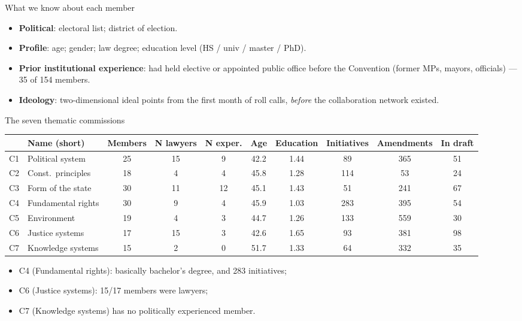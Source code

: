 \documentclass[aspectratio=169,11pt]{beamer}
\newcommand{\emphr}[1]{{\color{ndreddark}\textbf{#1}}}
\begin{document}
\begin{frame}{What we know about each member}
\begin{itemize}
  \item \emphr{Political}: electoral list; district of election.
  \vspace{0.2cm}
  \item \emphr{Profile}: age; gender; law degree; education level (HS / univ / master / PhD).
  \vspace{0.2cm}
  \item \emphr{Prior institutional experience}: had held elective or appointed public office before the Convention (former MPs, mayors, officials) — 35 of 154 members.
  \vspace{0.2cm}
  \item \emphr{Ideology}: two-dimensional ideal points from the first month of roll calls, \emph{before} the collaboration network existed.
\end{itemize}
\end{frame}

\begin{frame}{The seven thematic commissions}
\begin{center}\scriptsize\setlength{\tabcolsep}{3.5pt}
\begin{tabular}{clcccccccc}
\toprule
 & Name (short) & Members & N lawyers & N exper. & Age & Education & Initiatives & Amendments & In draft \\
\midrule
C1 & Political system & 25 & 15 & 9 & 42.2 & 1.44 & 89 & 365 & 51 \\
C2 & Const.\ principles & 18 & 4 & 4 & 45.8 & 1.28 & 114 & 53 & 24 \\
C3 & Form of the state & 30 & 11 & 12 & 45.1 & 1.43 & 51 & 241 & 67 \\
C4 & Fundamental rights & 30 & 9 & 4 & 45.9 & 1.03 & 283 & 395 & 54 \\
C5 & Environment & 19 & 4 & 3 & 44.7 & 1.26 & 133 & 559 & 30 \\
C6 & Justice systems & 17 & 15 & 3 & 42.6 & 1.65 & 93 & 381 & 98 \\
C7 & Knowledge systems & 15 & 2 & 0 & 51.7 & 1.33 & 64 & 332 & 35 \\
\bottomrule
\end{tabular}
\end{center}
\begin{itemize}
  \item \footnotesize C4 (Fundamental rights): basically bachelor's degree, and 283 initiatives; 
  \item C6 (Justice systems): 15/17 members were lawyers;
  \item C7 (Knowledge systems) has no politically experienced member.
\end{itemize}
\end{frame}
\end{document}

